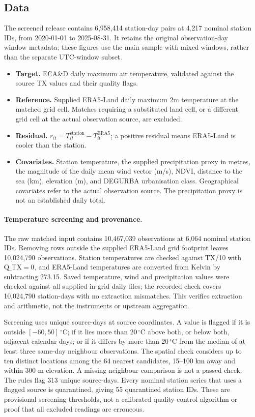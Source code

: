 \documentclass[a4paper,12pt,leqno]{article}
\begin{document}
\subsection{Data}

The screened release contains 6,958,414 station-day pairs at 4,217 nominal
station IDs, from 2020-01-01 to 2025-08-31. It retains the original
observation-day window metadata; these figures use the main sample with
mixed windows, rather than the separate UTC-window subset.

\begin{itemize}
\item \textbf{Target.} ECA\&D daily maximum air temperature, validated
against the source TX values and their quality flags.
\item \textbf{Reference.} Supplied ERA5-Land daily maximum 2m temperature
at the matched grid cell. Matches requiring a substituted land cell,
or a different grid cell at the actual observation source, are excluded.
\item \textbf{Residual.} $r_{it}=T^{\mathrm{station}}_{it}-T^{\mathrm{ERA5}}_{it}$;
a positive residual means ERA5-Land is cooler than the station.
\item \textbf{Covariates.} Station temperature, the supplied precipitation
proxy in metres, the magnitude of the daily mean wind vector (m/s),
NDVI, distance to the sea (km), elevation (m), and DEGURBA urbanisation
class. Geographical covariates refer to the actual observation source.
The precipitation proxy is not an established daily total.
\end{itemize}

\paragraph{Temperature screening and provenance.}
The raw matched input contains 10,467,039 observations at 6,064 nominal
station IDs. Removing rows outside the supplied ERA5-Land grid footprint
leaves 10,024,790 observations. Station temperatures are checked against
TX/10 with $\mathrm{Q\_TX}=0$, and ERA5-Land temperatures are converted
from Kelvin by subtracting 273.15. Saved temperature, wind and precipitation
values were checked against all supplied in-grid daily files; the recorded
check covers 10,024,790 station-days with no extraction mismatches.
This verifies extraction and arithmetic, not the instruments or upstream
aggregation.

Screening uses unique source-days at source coordinates. A value is flagged
if it is outside $[-60,50]\,^\circ$C; if it lies more than $20\,^\circ$C
above both, or below both, adjacent calendar days; or if it differs by
more than $20\,^\circ$C from the median of at least three same-day
neighbour observations. The spatial check considers up to ten distinct
locations among the 64 nearest candidates, 15--100 km away and within
300 m elevation. A missing neighbour comparison is not a passed check.
The rules flag 313 unique source-days. Every nominal station series that
uses a flagged source is quarantined, giving 55 quarantined station IDs.
These are provisional screening thresholds, not a calibrated quality-control
algorithm or proof that all excluded readings are erroneous.
\end{document}
